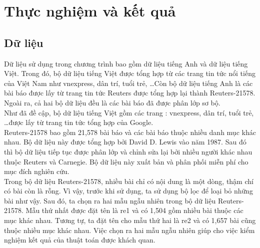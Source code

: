 \chapter{Thực nghiệm và kết quả}
\label{Chapter4}
\section{Dữ liệu}
\hspace{10mm} Dữ liệu sử dụng trong chương trình bao gồm dữ liệu tiếng Anh và dữ liệu tiếng Việt. Trong đó, bộ dữ liệu tiếng Việt được tổng hợp từ các trang tin tức nổi tiếng của Việt Nam như vnexpress, dân trí, tuổi trẻ, \ldots Còn bộ dữ liệu tiếng Anh là các bài báo được lấy từ trang tin tức Reuters được tổng hợp lại thành Reuters-21578. Ngoài ra, cả hai bộ dữ liệu đều là các bài báo đã được phân lớp sơ bộ. \\
\hspace*{10mm}Như đã đề cập, bộ dữ liệu tiếng Việt gồm các trang : vnexpress, dân trí, tuổi trẻ, \ldots được lấy từ trang tin tức tổng hợp của Google.  \\
\hspace*{10mm}Reuters-21578 bao gồm 21,578 bài báo và các bài báo thuộc nhiều danh mục khác nhau. Bộ dữ liệu này được tổng hợp bởi David D. Lewis vào năm 1987. Sau đó thì bộ dữ liệu tiếp tục được phân lớp và chỉnh sửa lại bởi nhiều người khác nhau thuộc Reuters và Carnegie. Bộ dữ liệu này xuất bản và phân phối miễn phí cho mục đích nghiên cứu.\\
\hspace*{10mm}Trong bộ dữ liệu Reuters-21578, nhiều bài chỉ có nội dung là một dòng, thậm chí có bài còn là rỗng. Vì vậy, trước khi sử dụng, ta sử dụng bộ lọc để loại bỏ những bài như vậy. Sau đó, ta chọn ra hai mẫu ngẫu nhiên trong bộ dữ liệu Reuters-21578. Mẫu thứ nhất được đặt tên là re1 và có 1,504 gồm nhiều bài thuộc các mục khác nhau. Tương tự, ta đặt tên cho mẫu thứ hai là re2 và có 1,657 bài cũng thuộc nhiều mục khác nhau. Việc chọn ra hai mẫu ngẫu nhiên giúp cho việc kiểm nghiệm kết quả của thuật toán được khách quan. \\



